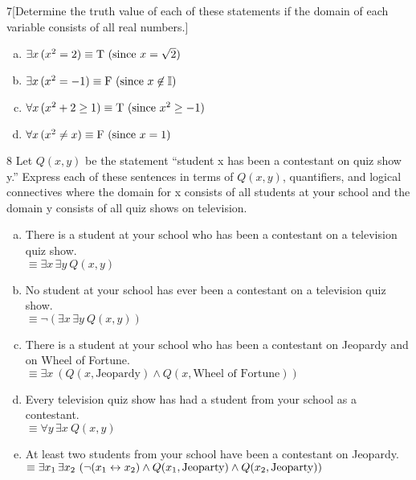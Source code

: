 \documentclass{homework}
\begin{document}
\begin{problem}{7}[Determine the truth value of each of these statements if the domain of each variable consists of all real numbers.]

\begin{enumerate}[(a)]
\item $\exists x \, (x^2 = 2) \\ \equiv \tt{T} \ (\textrm{since } x = \sqrt{2})$
\item $\exists x \, (x^2 = -1) \\ \equiv \tt{F} \ (\textrm{since } x \not\in \mathbb{I})$
\item $\forall x \, (x^2 + 2 \geq 1) \\ \equiv \tt{T} \ (\textrm{since } x^2 \geq -1)$
\item $\forall x \, (x^2 \neq x) \\ \equiv \tt{F} \ (\textrm{since } x = 1)$
\end{enumerate}
\end{problem}


\begin{problem}{8}
Let $Q(x, y)$ be the statement ``student x has been a contestant on quiz show y.'' 
Express each of these sentences in terms of $Q(x, y)$, quantifiers, and logical connectives where the domain for x consists of all students at your school and the domain y consists of all quiz shows on television.

\begin{enumerate}[(a)]
\item There is a student at your school who has been a contestant on a television quiz show. \\
  $\equiv \exists x \, \exists y \ Q(x, y)$

\item No student at your school has ever been a contestant on a television quiz show. \\
  $\equiv \neg (\exists x \, \exists y \ Q(x, y))$

\item There is a student at your school who has been a contestant on Jeopardy and on Wheel of Fortune. \\
  $\equiv \exists x \ (Q(x, \textrm{Jeopardy}) \land Q(x, \textrm{Wheel of Fortune}))$

\item Every television quiz show has had a student from your school as a contestant. \\
  $\equiv \forall y \, \exists x \ Q(x, y)$

\item At least two students from your school have been a contestant on Jeopardy. \\
  $\equiv \exists x_1 \, \exists x_2 \ (\neg (x_1 \bicond x_2) \land Q(x_1, \textrm{Jeoparty}) \land Q(x_2, \textrm{Jeoparty}))$

\end{enumerate}

\end{problem}
\end{document}
